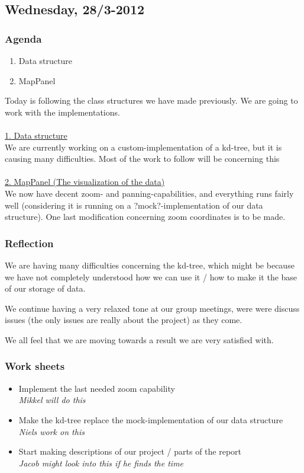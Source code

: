 \documentclass[a4paper,11pt]{article}
\begin{document}
\pagebreak
\subsection{Wednesday, 28/3-2012}

\subsubsection*{Agenda}
\begin{enumerate}
	\item Data structure
	\item MapPanel
\end{enumerate}
Today is following the class structures we have made previously. We are going to work with the implementations. \\ \\
\underline{1. Data structure} \\
We are currently working on a custom-implementation of a kd-tree, but it is causing many difficulties. Most of the work to follow will be concerning this \\ \\
\underline{2. MapPanel (The visualization of the data)} \\
We now have decent zoom- and panning-capabilities, and everything runs fairly well (considering it is running on a ?mock?-implementation of our data structure). One last modification concerning zoom coordinates is to be made.

\subsubsection*{Reflection}
We are having many difficulties concerning the kd-tree, which might be because we have not completely understood how we can use it / how to make it the base of our storage of data.

We continue having a very relaxed tone at our group meetings, were were discuss issues (the only issues are really about the project) as they come.

We all feel that we are moving towards a result we are very satisfied with.

\subsubsection*{Work sheets}
\begin{itemize}
	\item Implement the last needed zoom capability \\
		\textsl{Mikkel will do this}
	\item Make the kd-tree replace the mock-implementation of our data structure \\
		\textsl{Niels work on this}
	\item Start making descriptions of our project / parts of the report \\
		\textsl{Jacob might look into this if he finds the time}
\end{itemize}
\end{document}
